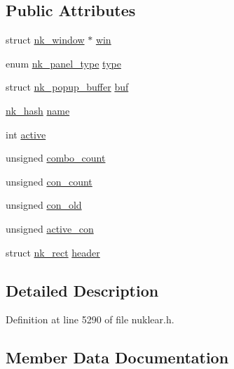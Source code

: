 \subsection*{Public Attributes}
\begin{DoxyCompactItemize}
\item 
struct \mbox{\hyperlink{structnk__window}{nk\+\_\+window}} $\ast$ \mbox{\hyperlink{structnk__popup__state_acce72ab5fd41fd54edf84d2a7915619c}{win}}
\item 
enum \mbox{\hyperlink{nuklear_8h_ae2eaaeccb136c68814c17bbc71496b99}{nk\+\_\+panel\+\_\+type}} \mbox{\hyperlink{structnk__popup__state_af50698b4abee20445ffdd61584ed9740}{type}}
\item 
struct \mbox{\hyperlink{structnk__popup__buffer}{nk\+\_\+popup\+\_\+buffer}} \mbox{\hyperlink{structnk__popup__state_a74261b023275e19b075c6db1dab8905b}{buf}}
\item 
\mbox{\hyperlink{nuklear_8h_a2123e2728db7d1f136b57d6528a0d757}{nk\+\_\+hash}} \mbox{\hyperlink{structnk__popup__state_aabf4437be5882c80a3a290bc5240bc68}{name}}
\item 
int \mbox{\hyperlink{structnk__popup__state_af70d53ef2db36f4d8d84fe5973cbd2a2}{active}}
\item 
unsigned \mbox{\hyperlink{structnk__popup__state_aa3c1aaa75caa20b7bb8b2506aceb45ab}{combo\+\_\+count}}
\item 
unsigned \mbox{\hyperlink{structnk__popup__state_ae2a49af137226e5994d10e2e33729aa6}{con\+\_\+count}}
\item 
unsigned \mbox{\hyperlink{structnk__popup__state_a5e6aef37a114b6d08184ff087d2d80e2}{con\+\_\+old}}
\item 
unsigned \mbox{\hyperlink{structnk__popup__state_af670e7c6e45a92e369dc54e7b7321f78}{active\+\_\+con}}
\item 
struct \mbox{\hyperlink{structnk__rect}{nk\+\_\+rect}} \mbox{\hyperlink{structnk__popup__state_a340e6ee6435224189edae0010a8bff37}{header}}
\end{DoxyCompactItemize}


\subsection{Detailed Description}


Definition at line 5290 of file nuklear.\+h.



\subsection{Member Data Documentation}
\mbox{\label{structnk__popup__state_af70d53ef2db36f4d8d84fe5973cbd2a2}} 

